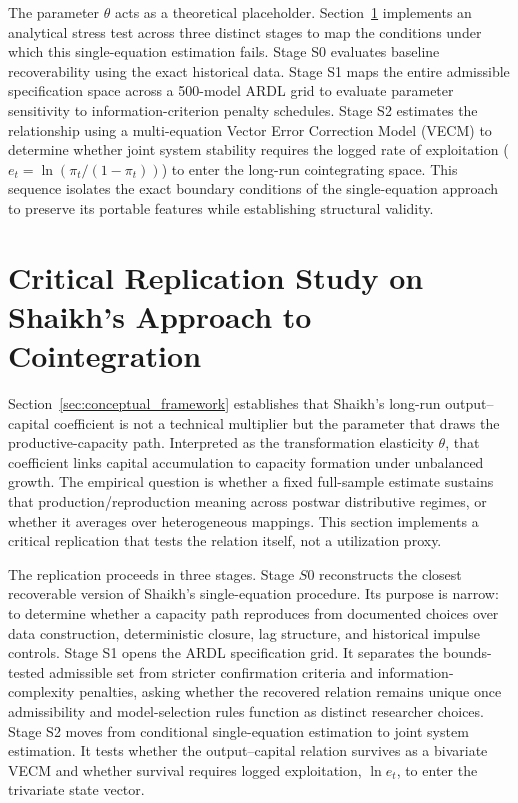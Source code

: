 \documentclass[11pt]{article}
\begin{document}
The parameter $\theta$ acts as a theoretical placeholder. Section~\ref{sec:replication_strategy} implements an analytical stress test across three distinct stages to map the conditions under which this single-equation estimation fails. Stage S0 evaluates baseline recoverability using the exact historical data. Stage S1 maps the entire admissible specification space across a 500-model ARDL grid to evaluate parameter sensitivity to information-criterion penalty schedules. Stage S2 estimates the relationship using a multi-equation Vector Error Correction Model (VECM) to determine whether joint system stability requires the logged rate of exploitation ($e_t = \ln(\pi_t / (1 - \pi_t))$) to enter the long-run cointegrating space. This sequence isolates the exact boundary conditions of the single-equation approach to preserve its portable features while establishing structural validity.

\section{Critical Replication Study on Shaikh’s Approach to Cointegration}
\label{sec:replication_strategy}

Section~\ref{sec:conceptual_framework} establishes that Shaikh's long-run output--capital coefficient is not a technical multiplier but the parameter that draws the productive-capacity path. Interpreted as the transformation elasticity $\theta$, that coefficient links capital accumulation to capacity formation under unbalanced growth. The empirical question is whether a fixed full-sample estimate sustains that production/reproduction meaning across postwar distributive regimes, or whether it averages over heterogeneous mappings. This section implements a critical replication that tests the relation itself, not a utilization proxy.

The replication proceeds in three stages. Stage $S0$ reconstructs the closest recoverable version of Shaikh's single-equation procedure. Its purpose is narrow: to determine whether a capacity path reproduces from documented choices over data construction, deterministic closure, lag structure, and historical impulse controls. Stage S1 opens the ARDL specification grid. It separates the bounds-tested admissible set from stricter confirmation criteria and information-complexity penalties, asking whether the recovered relation remains unique once admissibility and model-selection rules function as distinct researcher choices. Stage S2 moves from conditional single-equation estimation to joint system estimation. It tests whether the output--capital relation survives as a bivariate VECM and whether survival requires logged exploitation, \(\ln e_t\), to enter the trivariate state vector.
\end{document}
